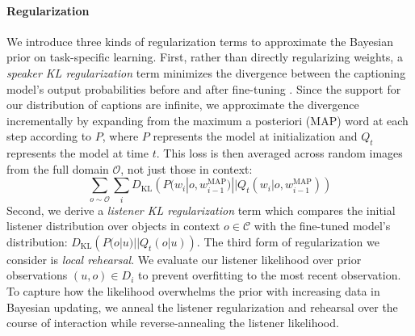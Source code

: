 \paragraph{Regularization} 
We introduce three kinds of regularization terms to approximate the Bayesian prior on task-specific learning.
First, rather than directly regularizing weights, a \emph{speaker KL regularization} term minimizes the divergence between the captioning model's output probabilities before and after fine-tuning \cite{yu2013kl, galashov_information_2018}. %
Since the support for our distribution of captions are infinite, we approximate the divergence incrementally by expanding from the maximum a posteriori (MAP) word at each step according to $P$, where $P$ represents the model at initialization and $Q_t$ represents the model at time $t$. 
This loss is then averaged across random images from the full domain $\mathcal{O}$, not just those in context:
\begin{equation}
	\sum_{o\sim\mathcal{O}}
	 			 \sum_i 
				 D_{\mathrm{KL}}
				 \left(
				 P(w_i |o, w^{\mathrm{MAP}}_{i-1})
				 ||
				 Q_t(w_i|o, w^{\mathrm{MAP}}_{i-1})
				 \right)
\label{eq:speaker_reg}
\end{equation}
Second, we derive a \emph{listener KL regularization} term which compares the initial listener distribution over objects in context $o \in \mathcal{C}$ with the fine-tuned model's distribution: $D_{\mathrm{KL}}\left(P(o | u)||Q_t(o | u)\right).$
The third form of regularization we consider is \emph{local rehearsal}.
We evaluate our listener likelihood over prior observations $(u,o) \in D_i$ to prevent overfitting to the most recent observation.
To capture how the likelihood overwhelms the prior with increasing data in Bayesian updating, we anneal the listener regularization and rehearsal over the course of interaction while reverse-annealing the listener likelihood.

